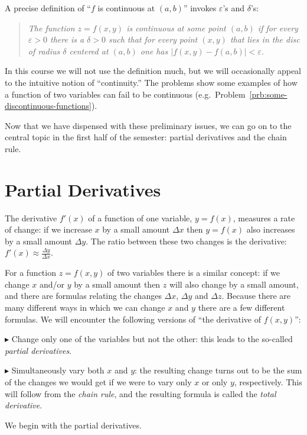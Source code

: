 A precise definition of ``$f$ is continuous at $(a,b)$'' invokes $\varepsilon$'s
and $\delta$'s:
\begin{quote}
  \itshape%
  The function $z=f(x, y)$ is continuous at some point $(a,b)$ if for every
  $\varepsilon>0$ there is a $\delta>0$ such that for every point $(x,y)$ that
  lies in the disc of radius $\delta$ centered at $(a,b)$ one has $|f(x,y) -
  f(a,b)| < \varepsilon$.
\end{quote}
In this course we will not use the definition much, but we will occasionally
appeal to the intuitive notion of ``continuity.''  The problems show some
examples of how a function of two variables can fail to be
continuous (e.g.~Problem~\ref{prb:some-discontinuous-functions}).

Now that we have dispensed with these preliminary issues, we can go on to the
central topic in the first half of the semester: partial derivatives and the
chain rule.

\section{Partial Derivatives}        
The derivative $f'(x)$ of a function of one variable, $y=f(x)$, measures a rate
of change: if we increase $x$ by a small amount $\Delta x$ then $y=f(x)$ also
increases by a small amount $\Delta y$.  The ratio between these two changes is
the derivative: $f'(x) \approx \frac{\Delta y}{\Delta x}$.

For a function $z=f(x, y)$ of two variables there is a similar concept: if we
change $x$ and/or $y$ by a small amount then $z$ will also change by a small
amount, and there are formulas relating the changes $\Delta x$, $\Delta y$ and
$\Delta z$.  Because there are many different ways in which we can change $x$
and $y$ there are a few different formulas.  We will encounter the following
versions of ``the derivative of $f(x, y)$'':

\textcolor{badgerred}{$\blacktriangleright$} Change only one of the variables
but not the other: this leads to the so-called \emph{partial derivatives}.

\textcolor{badgerred}{$\blacktriangleright$} Simultaneously vary both $x$ and
$y$: the resulting change turns out to be the sum of the changes we would get if
we were to vary only $x$ or only $y$, respectively.  This will follow from the
\emph{chain rule}, and the resulting formula is called the \emph{total
  derivative}.

We begin with the partial derivatives.

